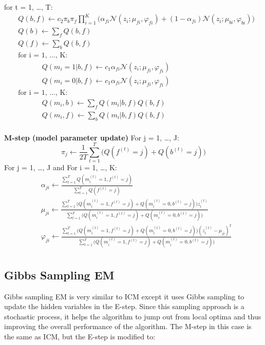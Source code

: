 \documentclass{article} %
\begin{document}
for t = 1, \ldots , T:
\begin{align*} 
&Q(b,f) \leftarrow c_2\pi_b\pi_f\prod_{i=1}^K\Bigg(\alpha_{fi}\mathcal{N}(z_i;\mu_{fi},\varphi_{fi})+ (1-\alpha_{fi})\mathcal{N}(z_i;\mu_{bi},\varphi_{bi}) \Bigg) \\
&Q(b) \leftarrow \sum_{f} Q(b,f) \\
&Q(f) \leftarrow \sum_{b} Q(b,f) \\
&\text{for i = 1, \ldots , K: } \\
&\text{ }\text{ }\text{ }\text{ }\text{ }Q(m_i = 1|b,f) \leftarrow c_1\alpha_{fi}\mathcal{N}(z_i;\mu_{fi},\varphi_{fi})\\
&\text{ }\text{ }\text{ }\text{ }\text{ }Q(m_i = 0|b,f) \leftarrow c_1\alpha_{fi}\mathcal{N}(z_i;\mu_{fi},\varphi_{fi})\\
&\text{for i = 1, \ldots , K: } \\
&\text{ }\text{ }\text{ }\text{ }\text{ }Q(m_i,b) \leftarrow \sum_{f}Q(m_i|b,f) Q(b,f)\\
&\text{ }\text{ }\text{ }\text{ }\text{ }Q(m_i,f) \leftarrow \sum_{b}Q(m_i|b,f) Q(b,f)\\
\end{align*} 

\textbf{M-step (model parameter update)}
For j = 1, \ldots , J: 
\begin{equation*}
\pi_j \leftarrow \frac{1}{2T}\sum_{t=1}^T\Bigg(Q(f^{(t)} = j) + Q(b^{(t)} = j)\Bigg)
\end{equation*}
For j = 1, \ldots , J and For i = 1, \ldots , K: 
\begin{align*} 
&\alpha_{ji} \leftarrow \frac{\sum_{t=1}^T Q(m_i^{(t)}=1,f^{(t)} = j)}{\sum_{t=1}^TQ(f^{(t)} = j)} \\
&\mu_{ji} \leftarrow \frac{\sum_{t=1}^T\Big(Q(m_i^{(t)}=1,f^{(t)} = j) + Q(m_i^{(t)}=0,b^{(t)} = j)\Big)z_i^{(t)}}{\sum_{t=1}^T \Big(Q(m_i^{(t)}=1,f^{(t)} = j) + Q(m_i^{(t)}=0,b^{(t)} = j)\Big)} \\
&\varphi_{ji} \leftarrow \frac{\sum_{t=1}^T\Big(Q(m_i^{(t)}=1,f^{(t)} = j) + Q(m_i^{(t)}=0,b^{(t)} = j)\Big)(z_i^{(t)}-\mu_{ji})^2}{\sum_{t=1}^T \Big(Q(m_i^{(t)}=1,f^{(t)} = j) + Q(m_i^{(t)}=0,b^{(t)} = j)\Big)} \\
\end{align*} 

\subsection{Gibbs Sampling EM}
\label{gibbs_em}
Gibbs sampling EM is very similar to ICM except it uses Gibbs sampling to update the hidden variables in the E-step. Since this sampling approach is a stochastic process, it helps the algorithm to jump out from local optima and thus improving the overall performance of the algorithm. The M-step in this case is the same as ICM, but the E-step is modified to:
\end{document}
